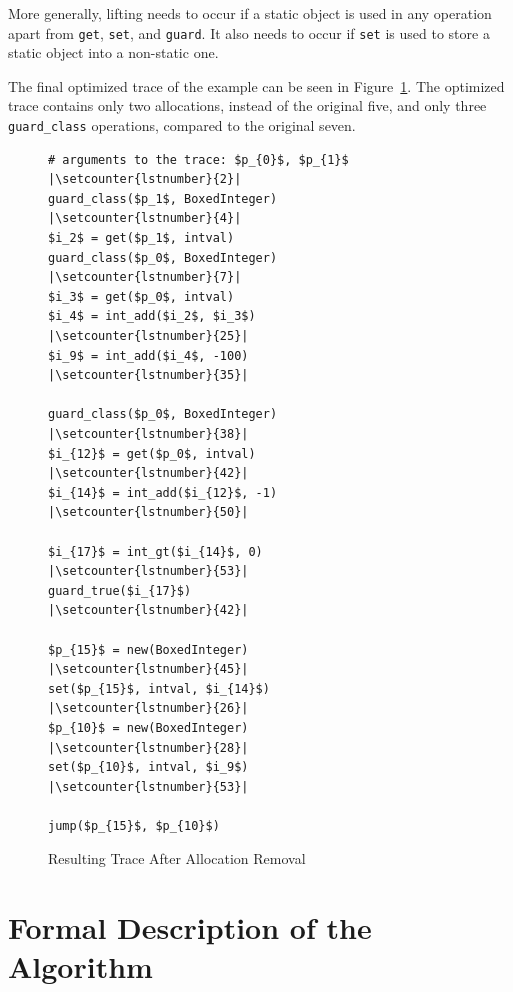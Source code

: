 \documentclass{sigplanconf}
\begin{document}
More generally, lifting needs to occur if a static object is used in any
operation apart from \lstinline{get}, \lstinline{set}, and \lstinline{guard}.
It also needs to occur if \lstinline{set} is used to store a static object into
a non-static one.

The final optimized trace of the example can be seen in Figure~\ref{fig:step1}.
The optimized trace contains only two allocations, instead of the original
five, and only three \lstinline{guard_class} operations, compared to the
original seven.

\begin{figure}
\begin{lstlisting}[mathescape,numbers=right,escapechar=|, numberblanklines=false,basicstyle=\setstretch{1.1}\ttfamily\scriptsize]
# arguments to the trace: $p_{0}$, $p_{1}$ |\setcounter{lstnumber}{2}|
guard_class($p_1$, BoxedInteger)           |\setcounter{lstnumber}{4}|
$i_2$ = get($p_1$, intval)
guard_class($p_0$, BoxedInteger)           |\setcounter{lstnumber}{7}|
$i_3$ = get($p_0$, intval)
$i_4$ = int_add($i_2$, $i_3$)              |\setcounter{lstnumber}{25}|
$i_9$ = int_add($i_4$, -100)               |\setcounter{lstnumber}{35}|

guard_class($p_0$, BoxedInteger)           |\setcounter{lstnumber}{38}|
$i_{12}$ = get($p_0$, intval)              |\setcounter{lstnumber}{42}|
$i_{14}$ = int_add($i_{12}$, -1)           |\setcounter{lstnumber}{50}|

$i_{17}$ = int_gt($i_{14}$, 0)             |\setcounter{lstnumber}{53}|
guard_true($i_{17}$)                       |\setcounter{lstnumber}{42}|

$p_{15}$ = new(BoxedInteger)               |\setcounter{lstnumber}{45}|
set($p_{15}$, intval, $i_{14}$)            |\setcounter{lstnumber}{26}|
$p_{10}$ = new(BoxedInteger)               |\setcounter{lstnumber}{28}|
set($p_{10}$, intval, $i_9$)               |\setcounter{lstnumber}{53}|

jump($p_{15}$, $p_{10}$)
\end{lstlisting}

\caption{Resulting Trace After Allocation Removal}
\label{fig:step1}
\end{figure}


\section{Formal Description of the Algorithm}
\label{sec:formal}
\end{document}
